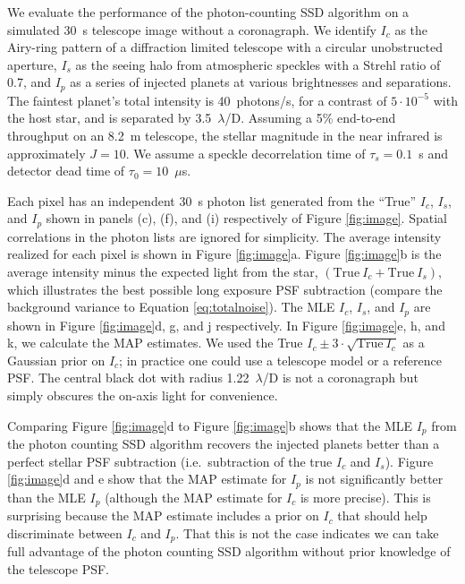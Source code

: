 \documentclass[../main.tex]{subfiles}
\begin{document}
We evaluate the performance of the photon-counting SSD algorithm on a simulated 30~s telescope image without a coronagraph. We identify $I_c$ as the Airy-ring pattern of a diffraction limited telescope with a circular unobstructed aperture, $I_s$ as the seeing halo from atmospheric speckles with a Strehl ratio of 0.7, and $I_p$ as a series of injected planets at various brightnesses and separations. The faintest planet's total intensity is 40~photons/s, for a contrast of $5 \cdot 10^{-5}$ with the host star, and is separated by 3.5~$\lambda$/D. Assuming a 5\% end-to-end throughput on an 8.2~m telescope, the stellar magnitude in the near infrared is approximately $J=10$. We assume a speckle decorrelation time of $\tau_s=0.1$~s and detector dead time of $\tau_0=10$~$\mu$s.

Each pixel has an independent 30~s photon list generated from the ``True'' $I_c$, $I_s$, and $I_p$ shown in panels (c), (f), and (i) respectively of Figure \ref{fig:image}. Spatial correlations in the photon lists are ignored for simplicity. The average intensity realized for each pixel is shown in Figure \ref{fig:image}a. Figure \ref{fig:image}b is the average intensity minus the expected light from the star, $(\textrm{True}~I_c + \textrm{True}~I_s)$, which illustrates the best possible long exposure PSF subtraction (compare the background variance to Equation \eqref{eq:totalnoise}). The MLE $I_c$, $I_s$, and $I_p$ are shown in Figure \ref{fig:image}d, g, and j respectively. In Figure \ref{fig:image}e, h, and k, we calculate the MAP estimates. We used the True $I_c \pm 3\cdot \sqrt{\text{True}~I_c}$ as a Gaussian prior on $I_c$; in practice one could use a telescope model or a reference PSF. The central black dot with radius 1.22~$\lambda$/D is not a coronagraph but simply obscures the on-axis light for convenience. 

Comparing Figure \ref{fig:image}d to Figure \ref{fig:image}b shows that the MLE $I_p$ from the photon counting SSD algorithm recovers the injected planets better than a perfect stellar PSF subtraction (i.e.~subtraction of the true $I_c$ and $I_s$). Figure \ref{fig:image}d and e show that the MAP estimate for $I_p$ is not significantly better than the MLE $I_p$ (although the MAP estimate for $I_c$ is more precise). This is surprising because the MAP estimate includes a prior on $I_c$ that should help discriminate between $I_c$ and $I_p$. That this is not the case indicates we can take full advantage of the photon counting SSD algorithm without prior knowledge of the telescope PSF. 
\end{document}
